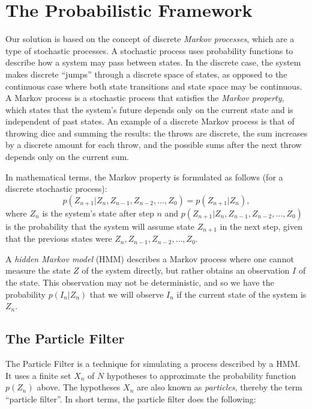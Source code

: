 \section*{The Probabilistic Framework}

Our solution is based on the concept of discrete \emph{Markov processes}, which are a type of stochastic processes. A stochastic process uses probability functions to describe how a system may pass between states. In the discrete case, the system makes discrete ``jumps'' through a discrete space of states, as opposed to the continuous case where both state transitions and state space may be continuous. A Markov process is a stochastic process that satisfies the \emph{Markov property}, which states that the system's future depends only on the current state and is independent of past states. An example of a discrete Markov process is that of throwing dice and summing the results: the throws are discrete, the sum increases by a discrete amount for each throw, and the possible sums after the next throw depends only on the current sum.

In mathematical terms, the Markov property is formulated as follows (for a discrete stochastic process):
\begin{equation}
  p\left(Z_{n+1}|Z_n, Z_{n-1}, Z_{n-2}, \dots, Z_0\right) = p\left(Z_{n+1}|Z_n\right),
\end{equation}
where $Z_n$ is the system's state after step $n$ and $p\left(Z_{n+1}|Z_n, Z_{n-1}, Z_{n-2}, \dots, Z_0\right)$ is the probability that the system will assume state $Z_{n+1}$ in the next step, given that the previous states were $Z_n, Z_{n-1}, Z_{n-2}, \dots, Z_0$.

A \emph{hidden Markov model} (HMM) describes a Markov process where one cannot measure the state $Z$ of the system directly, but rather obtains an observation $I$ of the state. This observation may not be deterministic, and so we have the probability $p(I_n|Z_n)$ that we will observe $I_n$ if the current state of the system is $Z_n$.

\subsection*{The Particle Filter}
The Particle Filter is a technique for simulating a process described by a HMM. It uses a finite set $X_n$ of $N$ hypotheses to approximate the probability function $p(Z_n)$ above. The hypotheses $X_n$ are also known as \emph{particles}, thereby the term ``particle filter''. In short terms, the particle filter does the following:

